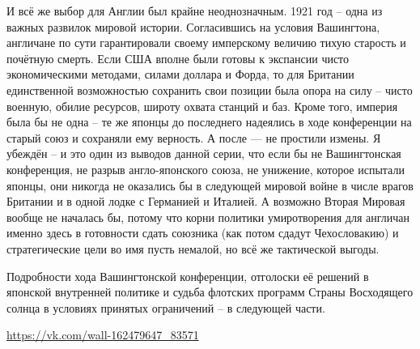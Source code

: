 И всё же выбор для Англии был крайне неоднозначным. 1921 год – одна из важных развилок мировой истории. Согласившись на условия Вашингтона, англичане по сути гарантировали своему имперскому величию тихую старость и почётную смерть. Если США вполне были готовы к экспансии чисто экономическими методами, силами доллара и Форда, то для Британии единственной возможностью сохранить свои позиции была опора на силу – чисто военную, обилие ресурсов, широту охвата станций и баз. Кроме того, империя была бы не одна – те же японцы до последнего надеялись в ходе конференции на старый союз и сохраняли ему верность. А после — не простили измены. Я убеждён – и это один из выводов данной серии, что если бы не Вашингтонская конференция, не разрыв англо-японского союза, не унижение, которое испытали японцы, они никогда не оказались бы в следующей мировой войне в числе врагов Британии и в одной лодке с Германией и Италией. А возможно Вторая Мировая вообще не началась бы, потому что корни политики умиротворения для англичан именно здесь в готовности сдать союзника (как потом сдадут Чехословакию) и стратегические цели во имя пусть немалой, но всё же тактической выгоды.

Подробности хода Вашингтонской конференции, отголоски её решений в японской внутренней политике и судьба флотских программ Страны Восходящего солнца в условиях принятых ограничений – в следующей части.

\url{https://vk.com/wall-162479647_83571}
